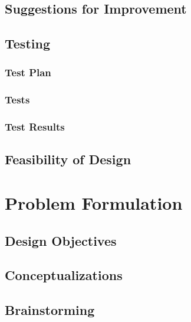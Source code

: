 \documentclass{article}
\begin{document}


\subsection{Suggestions for Improvement}


\newpage

\subsection{Testing}
\subsubsection{Test Plan}


\newpage

\subsubsection{Tests}


\subsubsection{Test Results}


\subsection{Feasibility of Design} %


\newpage
\appendix
\appendixpage

\section{Problem Formulation}
\subsection{Design Objectives}


\subsection{Conceptualizations}

\subsection{Brainstorming}

\end{document}

